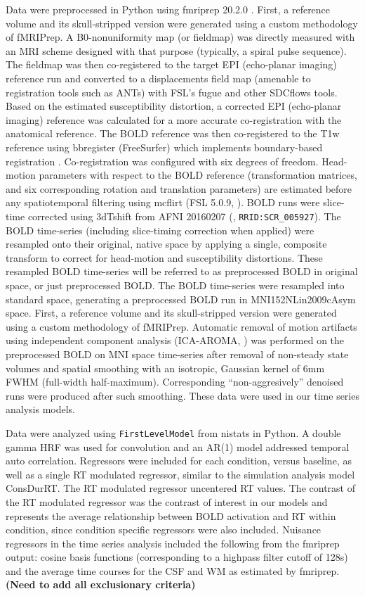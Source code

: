 \documentclass[titlepage,12pt] {article}
\begin{document}
Data were preprocessed in Python using fmriprep 20.2.0 \citep{esteban2019}.  First, a reference volume and its skull-stripped version were generated using a custom methodology of fMRIPrep. A B0-nonuniformity map (or fieldmap) was directly measured with an MRI scheme designed with that purpose (typically, a spiral pulse sequence). The fieldmap was then co-registered to the target EPI (echo-planar imaging) reference run and converted to a displacements field map (amenable to registration tools such as ANTs) with FSL’s fugue and other SDCflows tools. Based on the estimated susceptibility distortion, a corrected EPI (echo-planar imaging) reference was calculated for a more accurate co-registration with the anatomical reference. The BOLD reference was then co-registered to the T1w reference using bbregister (FreeSurfer) which implements boundary-based registration \citep{greve2009}. Co-registration was configured with six degrees of freedom. Head-motion parameters with respect to the BOLD reference (transformation matrices, and six corresponding rotation and translation parameters) are estimated before any spatiotemporal filtering using mcflirt (FSL 5.0.9, \citet{jenkinson2002}). BOLD runs were slice-time corrected using 3dTshift from AFNI 20160207 (\citet{cox1997}, \verb+RRID:SCR_005927+). The BOLD time-series (including slice-timing correction when applied) were resampled onto their original, native space by applying a single, composite transform to correct for head-motion and susceptibility distortions. These resampled BOLD time-series will be referred to as preprocessed BOLD in original space, or just preprocessed BOLD. The BOLD time-series were resampled into standard space, generating a preprocessed BOLD run in MNI152NLin2009cAsym space. First, a reference volume and its skull-stripped version were generated using a custom methodology of fMRIPrep. Automatic removal of motion artifacts using independent component analysis (ICA-AROMA, \citet{pruim2015}) was performed on the preprocessed BOLD on MNI space time-series after removal of non-steady state volumes and spatial smoothing with an isotropic, Gaussian kernel of 6mm FWHM (full-width half-maximum). Corresponding “non-aggresively” denoised runs were produced after such smoothing.  These data were used in our time series analysis models.


Data were analyzed using \verb+FirstLevelModel+ from nistats in Python.  A double gamma HRF was used for convolution and an AR(1) model addressed temporal auto correlation.  Regressors were included for each condition, versus baseline, as well as a single RT modulated regressor, similar to the simulation analysis model ConsDurRT.  The RT modulated regressor uncentered RT values.  The contrast of the RT modulated regressor was the contrast of interest in our models and represents the average relationship between BOLD activation and RT within condition, since condition specific regressors were also included.  Nuisance regressors in the time series analysis included the following from the fmriprep output: cosine basis functions (corresponding to a highpass filter cutoff of 128s) and the average time courses for the CSF and WM as estimated by fmriprep. \textbf{(Need to add all exclusionary criteria)}
\end{document}
